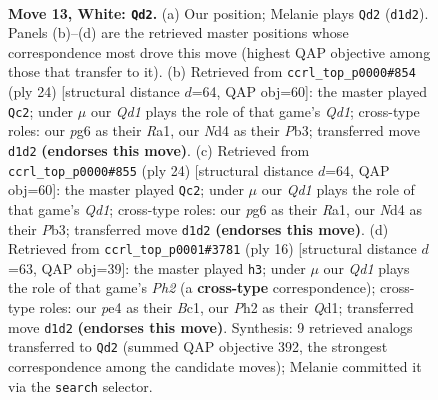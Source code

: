 \documentclass[11pt]{article}
\begin{document}
\begin{figure}[p]
\label{fig:thought-m22}
\end{figure}

\clearpage

\begin{figure}[p]\centering
\begin{subfigure}{0.46\textwidth}\centering
\resizebox{\linewidth}{!}{%
\newchessgame
\chessboard[
  setfen={r1bq1r1k/2pn1pb1/1p1p1np1/p2P3p/2PNp3/2N3PB/PP2PP1P/R1BQ1RK1 w - - 2 13},
  showmover=false,
  pgfstyle=straightmove, color=movearrow, markmove={d1-d2}
]}
\caption{}
\end{subfigure}\hfill
\begin{subfigure}{0.46\textwidth}\centering
\resizebox{\linewidth}{!}{%
\newchessgame
\chessboard[
  setfen={r1bqr1k1/3nbppp/p2p1n2/1ppP4/4P3/1PNB1N1P/P4PP1/R1BQ1RK1 w - - 1 13},
  showmover=false,
  pgfstyle=straightmove, color=movearrow, markmove={d1-c2}
]}
\caption{}
\end{subfigure}
\\[4pt]
\begin{subfigure}{0.46\textwidth}\centering
\resizebox{\linewidth}{!}{%
\newchessgame
\chessboard[
  setfen={r1bqr1k1/3nbppp/p2p1n2/1ppP4/4P3/1PNB1N1P/P4PP1/R1BQ1RK1 w - - 1 13},
  showmover=false,
  pgfstyle=straightmove, color=movearrow, markmove={d1-c2}
]}
\caption{}
\end{subfigure}\hfill
\begin{subfigure}{0.46\textwidth}\centering
\resizebox{\linewidth}{!}{%
\newchessgame
\chessboard[
  setfen={r1bq1rk1/pp1n1pbp/2pp1np1/4p3/2PPP3/2N2NP1/PP3PBP/R1BQ1RK1 w - - 0 9},
  showmover=false,
  pgfstyle=straightmove, color=movearrow, markmove={h2-h3}
]}
\caption{}
\end{subfigure}
\caption{\textbf{Move 13, White: \texttt{Qd2}.} (a) Our position; Melanie plays \texttt{Qd2} (\texttt{d1d2}). Panels (b)--(d) are the retrieved master positions whose correspondence most drove this move (highest QAP objective among those that transfer to it). (b) Retrieved from \texttt{ccrl\_top\_p0000\#854} (ply 24) [structural distance $d$=64, QAP obj=60]: the master played \texttt{Qc2}; under $\mu$ our \emph{Qd1} plays the role of that game's \emph{Qd1}; cross-type roles: our \emph{p}g6 as their \emph{R}a1, our \emph{N}d4 as their \emph{P}b3; transferred move \texttt{d1d2} \textbf{(endorses this move)}. (c) Retrieved from \texttt{ccrl\_top\_p0000\#855} (ply 24) [structural distance $d$=64, QAP obj=60]: the master played \texttt{Qc2}; under $\mu$ our \emph{Qd1} plays the role of that game's \emph{Qd1}; cross-type roles: our \emph{p}g6 as their \emph{R}a1, our \emph{N}d4 as their \emph{P}b3; transferred move \texttt{d1d2} \textbf{(endorses this move)}. (d) Retrieved from \texttt{ccrl\_top\_p0001\#3781} (ply 16) [structural distance $d$=63, QAP obj=39]: the master played \texttt{h3}; under $\mu$ our \emph{Qd1} plays the role of that game's \emph{Ph2} (a \textbf{cross-type} correspondence); cross-type roles: our \emph{p}e4 as their \emph{B}c1, our \emph{P}h2 as their \emph{Q}d1; transferred move \texttt{d1d2} \textbf{(endorses this move)}. Synthesis: 9 retrieved analogs transferred to \texttt{Qd2} (summed QAP objective 392, the strongest correspondence among the candidate moves); Melanie committed it via the \texttt{search} selector.}

\end{figure}
\end{document}
